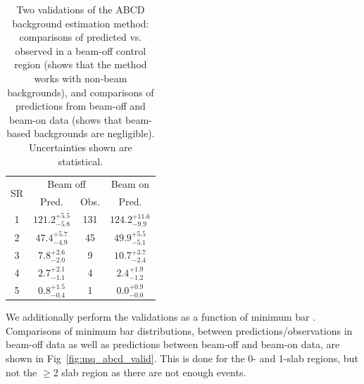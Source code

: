{\begin{table}[t]
\caption{Two validations of the ABCD background estimation method:
comparisons of predicted vs. observed in a beam-off control region
(shows that the method works with non-beam backgrounds), and comparisons
of predictions from beam-off and beam-on data (shows that beam-based
backgrounds are negligible). Uncertainties shown are statistical.
\label{tab:mq_abcd_valid}}
\centering
\renewcommand{\arraystretch}{1.3}
\begin{tabular}{c|cc|c}
\multirow{2}{*}{SR} & \multicolumn{2}{c}{Beam off} & Beam on \\
\cline{2-4}
 & Pred. & Obs. & Pred. \\
\hline
1 & $121.2^{+5.5}_{-5.8}$ & 131 & $124.2^{+11.6}_{-9.9}$ \\
2 & $47.4^{+5.7}_{-4.9}$ & 45 & $49.9^{+5.5}_{-5.1}$ \\
3 & $7.8^{+2.6}_{-2.0}$ & 9 & $10.7^{+3.7}_{-2.4}$ \\
4 & $2.7^{+2.1}_{-1.1}$ & 4 & $2.4^{+1.9}_{-1.2}$ \\
5 & $0.8^{+1.5}_{-0.4}$ & 1 & $0.0^{+0.9}_{-0.0}$ \\
\hline
\end{tabular}
\end{table}

We additionally perform the validations as a function of minimum bar \Npe. Comparisons of
minimum bar \Npe distributions, between predictions/observations in beam-off data
as well as predictions between beam-off and beam-on data, are shown in 
Fig~\ref{fig:mq_abcd_valid}. This is done for the 0- and 1-slab regions,
but not the $\geq$2 slab region as there are not enough events.

}
